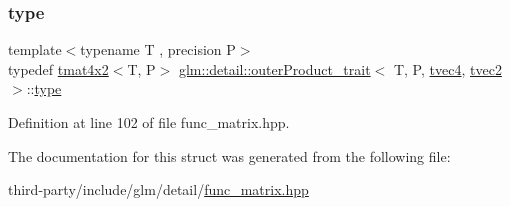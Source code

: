 \subsubsection{\texorpdfstring{type}{type}}
{\footnotesize\ttfamily template$<$typename T , precision P$>$ \\
typedef \hyperlink{structglm_1_1detail_1_1tmat4x2}{tmat4x2}$<$T, P$>$ \hyperlink{structglm_1_1detail_1_1outer_product__trait}{glm\+::detail\+::outer\+Product\+\_\+trait}$<$ T, P, \hyperlink{structglm_1_1detail_1_1tvec4}{tvec4}, \hyperlink{structglm_1_1detail_1_1tvec2}{tvec2} $>$\+::\hyperlink{structglm_1_1detail_1_1outer_product__trait_3_01_t_00_01_p_00_01tvec4_00_01tvec2_01_4_a15cc3a28bd3e09c75a19ce0349c76d9a}{type}}



Definition at line 102 of file func\+\_\+matrix.\+hpp.



The documentation for this struct was generated from the following file\+:\begin{DoxyCompactItemize}
\item 
third-\/party/include/glm/detail/\hyperlink{func__matrix_8hpp}{func\+\_\+matrix.\+hpp}\end{DoxyCompactItemize}

